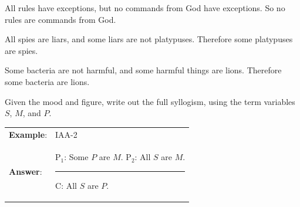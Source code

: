 \begin{exercises}
 
\item All rules have exceptions, but no commands from God have exceptions. So no rules are commands from God. 

 
\item All spies are liars, and some liars are not platypuses. Therefore some platypuses are spies.

 
\item Some bacteria are not harmful, and some harmful things are lions. Therefore some bacteria are lions. 
%
     
\end{exercises} 
 
\noindent\problempart Given the mood and figure, write out the full syllogism, using the term variables $S$, $M$, and $P$. 
\begin{longtabu}{p{.1\linewidth}p{.9\linewidth}} 
\textbf{Example}: &IAA-2 \\ 
\textbf{Answer}: & P$_1$: Some $P$ are $M$. \newline
P$_2$: All $S$ are $M$. 
\vskip -6pt
\rule{0.2\linewidth}{.5pt} \newline
C: All $S$ are $P$.
\end{longtabu} 

